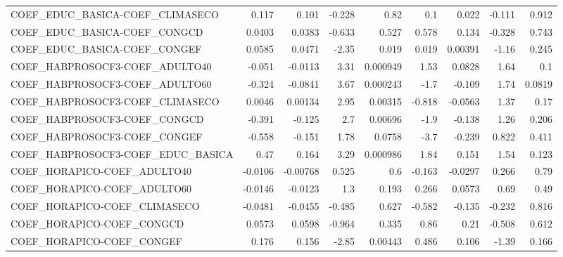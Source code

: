 \begin{tabular}{lrrrrrrrr}
COEF\_EDUC\_BASICA-COEF\_CLIMASECO       &       0.117 &        0.101 &  -0.228 &     0.82 &        0.1 &       0.022 &       -0.111 &         0.912 \\
COEF\_EDUC\_BASICA-COEF\_CONGCD          &      0.0403 &       0.0383 &  -0.633 &    0.527 &      0.578 &       0.134 &       -0.328 &         0.743 \\
COEF\_EDUC\_BASICA-COEF\_CONGEF          &      0.0585 &       0.0471 &   -2.35 &    0.019 &      0.019 &     0.00391 &        -1.16 &         0.245 \\
COEF\_HABPROSOCF3-COEF\_ADULTO40        &      -0.051 &      -0.0113 &    3.31 & 0.000949 &       1.53 &      0.0828 &         1.64 &           0.1 \\
COEF\_HABPROSOCF3-COEF\_ADULTO60        &      -0.324 &      -0.0841 &    3.67 & 0.000243 &       -1.7 &      -0.109 &         1.74 &        0.0819 \\
COEF\_HABPROSOCF3-COEF\_CLIMASECO       &      0.0046 &      0.00134 &    2.95 &  0.00315 &     -0.818 &     -0.0563 &         1.37 &          0.17 \\
COEF\_HABPROSOCF3-COEF\_CONGCD          &      -0.391 &       -0.125 &     2.7 &  0.00696 &       -1.9 &      -0.138 &         1.26 &         0.206 \\
COEF\_HABPROSOCF3-COEF\_CONGEF          &      -0.558 &       -0.151 &    1.78 &   0.0758 &       -3.7 &      -0.239 &        0.822 &         0.411 \\
COEF\_HABPROSOCF3-COEF\_EDUC\_BASICA     &        0.47 &        0.164 &    3.29 & 0.000986 &       1.84 &       0.151 &         1.54 &         0.123 \\
COEF\_HORAPICO-COEF\_ADULTO40           &     -0.0106 &     -0.00768 &   0.525 &      0.6 &     -0.163 &     -0.0297 &        0.266 &          0.79 \\
COEF\_HORAPICO-COEF\_ADULTO60           &     -0.0146 &      -0.0123 &     1.3 &    0.193 &      0.266 &      0.0573 &         0.69 &          0.49 \\
COEF\_HORAPICO-COEF\_CLIMASECO          &     -0.0481 &      -0.0455 &  -0.485 &    0.627 &     -0.582 &      -0.135 &       -0.232 &         0.816 \\
COEF\_HORAPICO-COEF\_CONGCD             &      0.0573 &       0.0598 &  -0.964 &    0.335 &       0.86 &        0.21 &       -0.508 &         0.612 \\
COEF\_HORAPICO-COEF\_CONGEF             &       0.176 &        0.156 &   -2.85 &  0.00443 &      0.486 &       0.106 &        -1.39 &         0.166 \\

\end{tabular}
